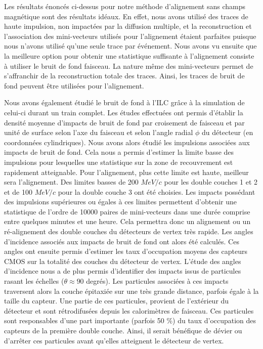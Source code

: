 \medskip

  Les r\'esultats \'enoncés ci-dessus pour notre m\'ethode d'alignement sans champs magn\'etique sont des r\'esultats id\'eaux. En effet, nous avons utilis\'e des traces de haute impulsion, non impact\'ees par la diffusion multiple, et la reconstruction et l'association des mini-vecteurs utilis\'es pour l'alignement étaient parfaites puisque nous n'avons utilis\'e qu'une seule trace par \'ev\'enement. Nous  avons vu ensuite que la meilleure option pour obtenir une statistique suffisante \`a l'alignement consiste \`a utiliser le bruit de fond faisceau. La nature m\^eme des mini-vecteurs permet de s'affranchir de la reconstruction totale des traces. Ainsi, les traces de bruit de fond peuvent \^etre utilis\'ees pour l'alignement. 

\medskip

  Nous avons \'egalement \'etudi\'e le bruit de fond \`a l'ILC gr\^ace \`a la simulation de celui-ci durant un train complet. Les \'etudes effectu\'ees ont permis d'\'etablir la densit\'e moyenne d'impacts de bruit de fond par croisement de faisceau et par unit\'e de surface selon l'axe du faisceau et selon l'angle radial $\phi$ du d\'etecteur (en coordonn\'ees cylindriques). Nous avons alors \'etudi\'e les impulsions associ\'ees aux impacts de bruit de fond. Cela nous a permis d'estimer la limite basse des impulsions pour lesquelles une statistique sur la zone de recouvrement est rapidement atteignable. Pour l'alignement, plus cette limite est haute, meilleur sera l'alignement. Des limites basses de 200 $MeV/c$ pour les double couches 1 et 2 et de 100 $MeV/c$ pour la double couche 3 ont \'et\'e choisies. Les impacts poss\'edant des impulsions sup\'erieures ou \'egales \`a ces limites permettent d'obtenir une statistique de l'ordre de 10000 paires de mini-vecteurs dans une dur\'ee comprise entre quelques minutes et une heure. Cela permettra donc un alignement ou un r\'e-alignement des double couches du d\'etecteurs de vertex tr\`es rapide. Les angles d'incidence associ\'es aux impacts de bruit de fond ont alors \'et\'e calcul\'es. Ces angles ont ensuite permis d'estimer les taux d'occupation moyens des capteurs CMOS sur la totalit\'e des couches du d\'etecteur de vertex. L'\'etude des angles d'incidence nous a de plus permis d'identifier des impacts issus de particules rasant les \'echelles ($\theta \approx 90$ degr\'es). Les particules associ\'ees \`a ces impacts traversent alors la couche \'epitaxi\'ee sur une tr\`es grande distance, parfois \'egale \`a la taille du capteur. Une partie de ces particules, provient de l'ext\'erieur du d\'etecteur et sont r\'etrodifus\'ees depuis les calorim\`etres de faisceau. Ces particules sont responsables d'une part importante (parfois 50 $\%$) du taux d'occupation des capteurs de la premi\`ere double couche. Ainsi, il serait b\'en\'efique de dévier ou d'arrêter ces particules avant qu'elles atteignent le d\'etecteur de vertex.
  
